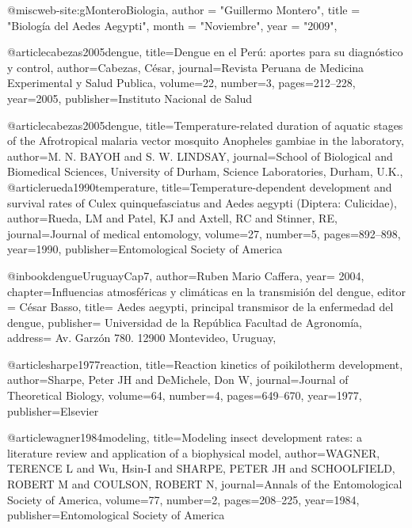 @misc{web-site:gMonteroBiologia,
      author = "Guillermo Montero",
      title = "Biología del Aedes Aegypti",
      month = "Noviembre",
      year = "2009",
}

@article{cabezas2005dengue,
  title={Dengue en el Per{\'u}: aportes para su diagn{\'o}stico y control},
  author={Cabezas, C{\'e}sar},
  journal={Revista Peruana de Medicina Experimental y Salud Publica},
  volume={22},
  number={3},
  pages={212--228},
  year={2005},
  publisher={Instituto Nacional de Salud}
}

@article{cabezas2005dengue,
  title={Temperature-related duration of aquatic stages of the Afrotropical malaria vector mosquito Anopheles gambiae in the laboratory},
  author={M. N. BAYOH and S. W. LINDSAY},
  journal={School of Biological and Biomedical Sciences, University of Durham, Science Laboratories, Durham, U.K.},
}
@article{rueda1990temperature,
  title={Temperature-dependent development and survival rates of Culex quinquefasciatus and Aedes aegypti (Diptera: Culicidae)},
  author={Rueda, LM and Patel, KJ and Axtell, RC and Stinner, RE},
  journal={Journal of medical entomology},
  volume={27},
  number={5},
  pages={892--898},
  year={1990},
  publisher={Entomological Society of America}
}

@inbook{dengueUruguayCap7,
  author={Ruben Mario Caffera},
  year= 2004, 
  chapter={Influencias atmosféricas y climáticas en la transmisión del dengue}, 
  editor = {César Basso}, 
  title= {Aedes aegypti, principal transmisor de la enfermedad del dengue}, 
  publisher= {Universidad de la República Facultad de Agronomía},
  address= {Av. Garzón 780. 12900 Montevideo, Uruguay}, 
}

@article{sharpe1977reaction,
  title={Reaction kinetics of poikilotherm development},
  author={Sharpe, Peter JH and DeMichele, Don W},
  journal={Journal of Theoretical Biology},
  volume={64},
  number={4},
  pages={649--670},
  year={1977},
  publisher={Elsevier}
}

@article{wagner1984modeling,
  title={Modeling insect development rates: a literature review and application of a biophysical model},
  author={WAGNER, TERENCE L and Wu, Hsin-I and SHARPE, PETER JH and SCHOOLFIELD, ROBERT M and COULSON, ROBERT N},
  journal={Annals of the Entomological Society of America},
  volume={77},
  number={2},
  pages={208--225},
  year={1984},
  publisher={Entomological Society of America}
}
